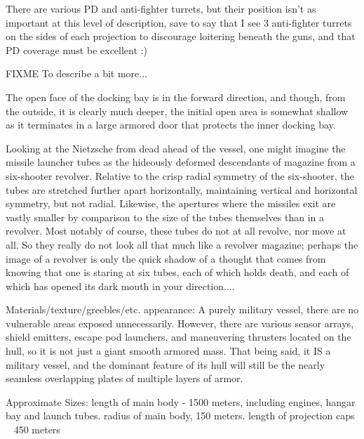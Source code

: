 There are various PD and anti-fighter turrets, but their position isn't as important at this level of description, save to say that I see 3 anti-fighter turrets on the sides of each projection to discourage loitering beneath the guns, and that PD coverage must be excellent :) 

FIXME To describe a bit more... 

The open face of the docking bay is in the forward direction, and though, from the outside, it is clearly much deeper, the initial open area is somewhat shallow as it terminates in a large armored door that protects the inner docking bay. 

Looking at the Nietzsche from dead ahead of the vessel, one might imagine the missile launcher tubes as the hideously deformed descendants of magazine from a six-shooter revolver. Relative to the crisp radial symmetry of the six-shooter, the tubes are stretched further apart horizontally, maintaining vertical and horizontal symmetry, but not radial. Likewise, the apertures where the missiles exit are vastly smaller by comparison to the size of the tubes themselves than in a revolver. Most notably of course, these tubes do not at all revolve, nor move at all. So they really do not look all that much like a revolver magazine; perhaps the image of a revolver is only the quick shadow of a thought that comes from knowing that one is staring at six tubes, each of which holds death, and each of which has opened its dark mouth in your direction.... 

Materials/texture/greebles/etc. appearance: A purely military vessel, there are no vulnerable areas exposed unnecessarily. However, there are various sensor arrays, shield emitters, escape pod launchers, and maneuvering thrusters located on the hull, so it is not just a giant smooth armored mass. That being said, it IS a military vessel, and the dominant feature of its hull will still be the nearly seamless overlapping plates of multiple layers of armor. 

Approximate Sizes: length of main body - 1500 meters, including engines, hangar bay and launch tubes. radius of main body, 150 meters. length of projection caps ~ 450 meters 

